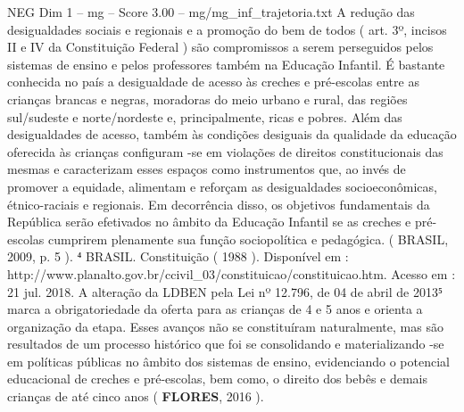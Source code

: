 \begin{textsample}{NEG Dim 1 – mg – Score 3.00 – mg/mg\_inf\_trajetoria.txt}
A redução das desigualdades sociais e regionais e a promoção do bem de todos ( art. 3º, incisos II e IV da Constituição Federal ) são compromissos a serem perseguidos pelos sistemas de ensino e pelos professores também na Educação Infantil.
É bastante conhecida no país a desigualdade de acesso às creches e pré-escolas entre as crianças brancas e negras, moradoras do meio urbano e rural, das regiões sul/sudeste e norte/nordeste e, principalmente, ricas e pobres.
Além das desigualdades de acesso, também às condições desiguais da qualidade da educação oferecida às crianças configuram -se em violações de direitos constitucionais das mesmas e caracterizam esses espaços como instrumentos que, ao invés de promover a equidade, alimentam e reforçam as desigualdades socioeconômicas, étnico-raciais e regionais.
Em decorrência disso, os objetivos fundamentais da República serão efetivados no âmbito da Educação Infantil se as creches e pré-escolas cumprirem plenamente sua função sociopolítica e pedagógica. ( BRASIL, 2009, p. 5 ). ⁴ BRASIL.
Constituição ( 1988 ).
Disponível em : http://www.planalto.gov.br/ccivil\_03/constituicao/constituicao.htm.
Acesso em : 21 jul. 2018.
A alteração da LDBEN pela Lei nº 12.796, de 04 de abril de 2013⁵ marca a obrigatoriedade da oferta para as crianças de 4 e 5 anos e orienta a organização da etapa.
Esses avanços não se constituíram naturalmente, mas são resultados de um processo histórico que foi se consolidando e materializando -se em políticas públicas no âmbito dos sistemas de ensino, evidenciando o potencial educacional de creches e pré-escolas, bem como, o direito dos bebês e demais crianças de até cinco anos ( \textbf{FLORES}, 2016 ).

\end{textsample}
